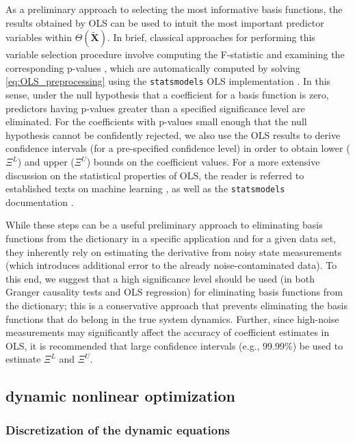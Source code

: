 \documentclass[12pt]{article}
\begin{document}
As a preliminary approach to selecting the most informative basis functions, the results obtained by OLS can be used to intuit  the most important predictor variables within $\Theta(\tilde{\textbf{X}})$. In brief, classical approaches for performing this variable selection procedure involve computing the F-statistic and examining the corresponding p-values \cite{james2013introduction}, which are automatically computed by solving \eqref{eq:OLS_preprocessing} using the \verb"statsmodels" OLS implementation \cite{seabold2010statsmodels}. In this sense, under the null hypothesis that a coefficient for a basis function is zero, predictors having p-values greater than a specified significance level are eliminated. For the coefficients with p-values small enough that the null hypothesis cannot be confidently rejected, we also use the OLS results to derive confidence intervals (for a pre-specified confidence level) in order to obtain lower ($\Xi^L$) and upper ($\Xi^U$)  bounds on the coefficient values. For a more extensive discussion on the statistical properties of OLS, the reader is referred to established texts on  machine learning \cite{bishop2006pattern, james2013introduction}, as well as the \verb"statsmodels" documentation \cite{seabold2010statsmodels}.

While these steps can be a useful preliminary approach to eliminating basis functions from the dictionary in a specific application and for a given data set, they inherently rely  on estimating the derivative from noisy state measurements (which introduces additional error to the already noise-contaminated data). To this end, we suggest that a high significance level should be used (in both Granger causality tests and OLS regression) for eliminating basis functions from the dictionary; this is a conservative approach that prevents eliminating the basis functions that do belong in the true system dynamics. Further, since high-noise measurements may significantly affect the accuracy of coefficient estimates in OLS, it is recommended that large confidence intervals (e.g., 99.99\%) be  used to estimate $\Xi^L$ and $\Xi^U$.

\subsection*{\ours{} dynamic nonlinear optimization}

\subsubsection*{Discretization of the dynamic equations}
\end{document}
